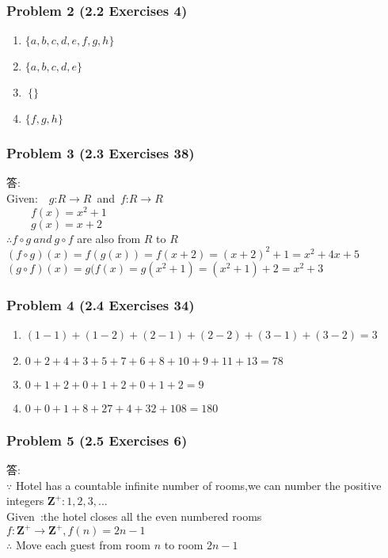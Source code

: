 \documentclass[14pt,hyperref={bookmarks=false}]{beamer}
\begin{document}
	\begin{frame}
	\frametitle{Problem 2 (2.2 Exercises 4)}
	\fontsize{10}{10pt}\selectfont
	\begin{enumerate}[label=(\alph*)]
	\item $\{a, b, c, d, e, f, g, h\}$
	\item $\{a,b,c,d,e\}$
	\item $~\{\}$
	\item $\{f,g,h\}$
	\end{enumerate}
	\end{frame}

	\begin{frame}
	\frametitle{Problem 3 (2.3 Exercises 38)}
	\fontsize{10}{10pt}\selectfont
	答:\\
	Given:~~$g$:$R \rightarrow R$~and~$f$:$R \rightarrow R$\\
	$~~~~~~~~~~f(x)=x^2+1$\\
	$~~~~~~~~~~g(x)=x+2$\\
	$\therefore f \circ g~and~g \circ f$ are also from $R$ to $R$\\
	$(f \circ g)(x)=f(g(x))=f(x+2)=(x+2)^2+1=x^2+4x+5$\\
	$(g \circ f)(x)=g(f(x)=g(x^2+1)=(x^2+1)+2=x^2+3$\\
	\end{frame}

	\begin{frame}
	\frametitle{Problem 4 (2.4 Exercises 34)}
	\fontsize{10}{10pt}\selectfont
	\begin{enumerate}[label=(\alph*)]
	\item $(1−1)+(1-2)+(2−1)+(2−2)+(3−1)+(3−2)=3$
	\item $0+2+4+3+5+7+6+8+10+9+11+13=78
	 $
	\item $0+1+2+0+1+2+0+1+2=9$
	\item $0+0+1+8+27+4+32+108=180$
	\end{enumerate}
	\end{frame}
	
	\begin{frame}
	\frametitle{Problem 5 (2.5 Exercises 6)}
	\fontsize{10}{10pt}\selectfont
	答:\\
	$\because$ Hotel has a countable infinite number of rooms,we can number the  positive integers $\mathbf{Z^+}:1,2,3,...$\\
	Given~:the hotel closes all the even numbered rooms\\
	$f:\mathbf{Z^+} \rightarrow \mathbf{Z^+},f(n)=2n-1$\\
	$\therefore$ Move each guest from room $n$ to room $2n-1$
	\end{frame}
	
\end{document}
